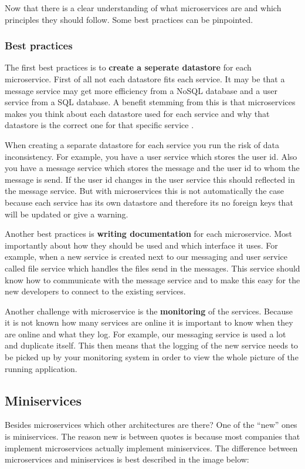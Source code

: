 Now that there is a clear understanding of what microservices are and which principles
they should follow. Some best practices can be pinpointed.

\subsubsection{Best practices}
The first best practices is to \textbf{create a seperate datastore} for each microservice. First of all not each datastore fits each service. It may be that a message service may get more efficiency from a NoSQL database and a user service from a SQL database. A benefit stemming from this is that microservices makes you think about each datastore used for each service and why that datastore is the correct one for that specific service \cite{microservicesNetflix}.

When creating a separate datastore for each service you run the risk of data inconsistency. For example, you have a user service which stores the user id. Also you have a message service which stores the message and the user id to whom the message is send. If the user id changes in the user service this should reflected in the message service. But with microservices this is not automatically the case because each service has its own datastore and therefore its no foreign keys that will be updated or give a warning.

Another best practices is \textbf{writing documentation} \cite{microservicesBestPractice} for each microservice. Most importantly about how they should be used and which interface it uses. For example, when a new service is created next to our messaging and user service called file service which handles the files send in the messages. This service should know how to communicate with the message service and to make this easy for the new developers to connect to the existing services.

Another challenge with microservice is the \textbf{monitoring} \cite{microservicesBestPractice} of the services. Because it is not known how many services are online it is important to know when they are online and what they log. For example, our messaging service is used a lot and duplicate itself. This then means that the logging of the new service needs to be picked up by your monitoring system in order to view the whole picture of the running application.

\subsection{Miniservices}
Besides microservices which other architectures are there? One of the “new” ones is
miniservices. The reason new is between quotes is because most companies that implement
microservices actually implement miniservices. The difference between microservices and
miniservices is best described in the image below:


